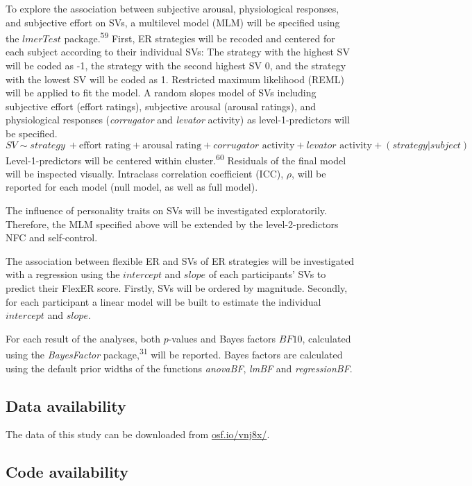 \documentclass[
  english,
  man,floatsintext]{apa6}
\begin{document}
To explore the association between subjective arousal, physiological responses, and subjective effort on SVs, a multilevel model (MLM) will be specified using the \(lmerTest\) package.\textsuperscript{59}
First, ER strategies will be recoded and centered for each subject according to their individual SVs: The strategy with the highest SV will be coded as -1, the strategy with the second highest SV 0, and the strategy with the lowest SV will be coded as 1.
Restricted maximum likelihood (REML) will be applied to fit the model.
A random slopes model of SVs including subjective effort (effort ratings), subjective arousal (arousal ratings), and physiological responses (\emph{corrugator} and \emph{levator} activity) as level-1-predictors will be specified.
\[
SV \sim strategy\ + \text{effort rating} + \text{arousal rating} + corrugator \text{ activity} + levator \text{ activity} + (strategy|subject)
\]
Level-1-predictors will be centered within cluster.\textsuperscript{60}
Residuals of the final model will be inspected visually.
Intraclass correlation coefficient (ICC), \(\rho\), will be reported for each model (null model, as well as full model).

The influence of personality traits on SVs will be investigated exploratorily.
Therefore, the MLM specified above will be extended by the level-2-predictors NFC and self-control.

The association between flexible ER and SVs of ER strategies will be investigated with a regression using the \(intercept\) and \(slope\) of each participants' SVs to predict their FlexER score.
Firstly, SVs will be ordered by magnitude.
Secondly, for each participant a linear model will be built to estimate the individual \(intercept\) and \(slope\).

For each result of the analyses, both \(p\)-values and Bayes factors \(BF10\), calculated using the \emph{BayesFactor} package,\textsuperscript{31} will be reported.
Bayes factors are calculated using the default prior widths of the functions \emph{anovaBF}, \emph{lmBF} and \emph{regressionBF}.

\hypertarget{data-availability}{%
\subsection{Data availability}\label{data-availability}}

The data of this study can be downloaded from \href{https://osf.io/vnj8x/}{osf.io/vnj8x/}.

\hypertarget{code-availability}{%
\subsection{Code availability}\label{code-availability}}
\end{document}
